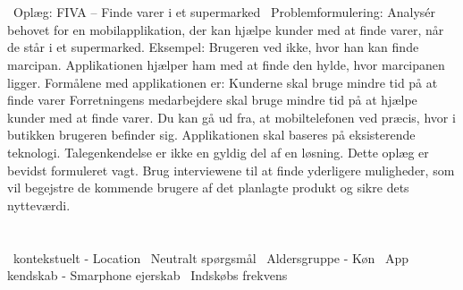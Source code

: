 \documentclass[12pt]{article}
\begin{document}
\section*{}
 \ Oplæg: FIVA – Finde varer i et supermarked
 \ Problemformulering: Analysér behovet for en mobilapplikation, der kan hjælpe kunder med at finde varer, når de står i et
supermarked. Eksempel: Brugeren ved ikke, hvor han kan finde marcipan. Applikationen hjælper
ham med at finde den hylde, hvor marcipanen ligger.
Formålene med applikationen er:
  Kunderne skal bruge mindre tid på at finde varer
  Forretningens medarbejdere skal bruge mindre tid på at hjælpe kunder med at finde varer.
Du kan gå ud fra, at mobiltelefonen ved præcis, hvor i butikken brugeren befinder sig.
Applikationen skal baseres på eksisterende teknologi. Talegenkendelse er ikke en gyldig del af en
løsning.
Dette oplæg er bevidst formuleret vagt. Brug interviewene til at finde yderligere muligheder, som
vil begejstre de kommende brugere af det planlagte produkt og sikre dets nytteværdi.

\section*{}
 \Brainstorm
 \ kontekstuelt - Location
 \ Neutralt sp\o rgsm\aa l
 \ Aldersgruppe - K\o n
 \ App kendskab - Smarphone ejerskab
 \ Indsk\o bs frekvens
 \ 
   
\end{document}
